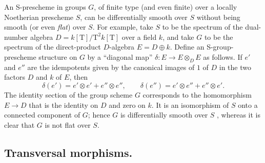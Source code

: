 \begin{remark}[17.12.8]
\label{IV.17.12.8}
An S-prescheme in groups $G$, of finite type (and even finite) over a locally Noetherian prescheme $S$, can be differentially smooth over $S$ without being smooth (or even \emph{flat}) over $S$.
For example, take $S$ to be the spectrum of the dual-number algebra
$D=k[\mathrm{T}]/\mathrm{T}^2k[\mathrm{T}]$ over a field $k$, and take $G$ to be the spectrum of the direct-product $D$-algebra $E=D\oplus k$.
Define an S-group-prescheme structure on $G$ by a ``diagonal map'' $\delta:E\to E\otimes_DE$ as follows.
If $e'$ and $e''$ are the idempotents given by the canonical images of $1$ of $D$ in the two factors $D$ and $k$ of $E$, then
\[
  \delta(e')=e'\otimes e'+e''\otimes e'',\qquad
  \delta(e'')=e'\otimes e''+e''\otimes e'.
\]
The identity section of the group scheme $G$ corresponds to the homomorphism $E\to D$ that is the identity on $D$ and zero on $k$.
It is an isomorphism of $S$ onto a connected component of $G$; hence $G$ is differentially smooth over $S$ , whereas it is clear that $G$ is not flat over $S$.
\end{remark}


\subsection{Transversal morphisms.}
\label{subsection:IV.17.13}
\label{IV.17.13}

